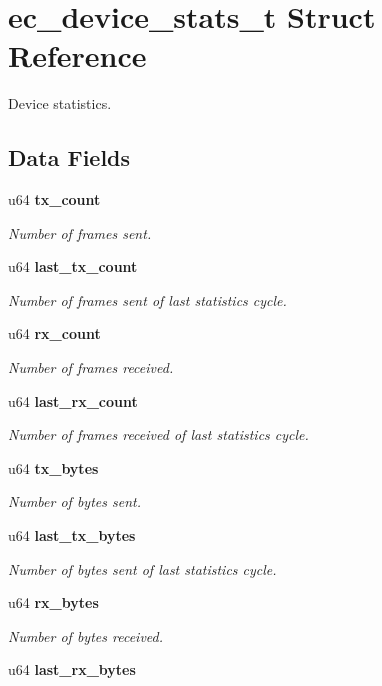 \section{ec\-\_\-device\-\_\-stats\-\_\-t Struct Reference}
\label{structec__device__stats__t}


Device statistics.  


\subsection*{Data Fields}
\begin{DoxyCompactItemize}
\item 
u64 {\bf tx\-\_\-count}
\begin{DoxyCompactList}\small\item\em Number of frames sent. \end{DoxyCompactList}\item 
u64 {\bf last\-\_\-tx\-\_\-count}
\begin{DoxyCompactList}\small\item\em Number of frames sent of last statistics cycle. \end{DoxyCompactList}\item 
u64 {\bf rx\-\_\-count}
\begin{DoxyCompactList}\small\item\em Number of frames received. \end{DoxyCompactList}\item 
u64 {\bf last\-\_\-rx\-\_\-count}
\begin{DoxyCompactList}\small\item\em Number of frames received of last statistics cycle. \end{DoxyCompactList}\item 
u64 {\bf tx\-\_\-bytes}
\begin{DoxyCompactList}\small\item\em Number of bytes sent. \end{DoxyCompactList}\item 
u64 {\bf last\-\_\-tx\-\_\-bytes}
\begin{DoxyCompactList}\small\item\em Number of bytes sent of last statistics cycle. \end{DoxyCompactList}\item 
u64 {\bf rx\-\_\-bytes}
\begin{DoxyCompactList}\small\item\em Number of bytes received. \end{DoxyCompactList}\item 
u64 {\bf last\-\_\-rx\-\_\-bytes}\label{structec__device__stats__t_af577e001b9fa7ca11696eb99e4dc1c94}


\end{DoxyCompactItemize}
